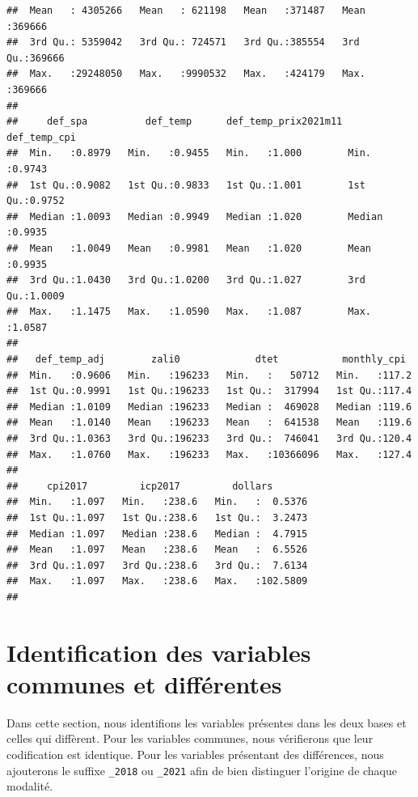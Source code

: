 \documentclass[
]{article}
\begin{document}
\begin{verbatim}
##  Mean   : 4305266   Mean   : 621198   Mean   :371487   Mean   :369666  
##  3rd Qu.: 5359042   3rd Qu.: 724571   3rd Qu.:385554   3rd Qu.:369666  
##  Max.   :29248050   Max.   :9990532   Max.   :424179   Max.   :369666  
##                                                                        
##     def_spa          def_temp      def_temp_prix2021m11  def_temp_cpi   
##  Min.   :0.8979   Min.   :0.9455   Min.   :1.000        Min.   :0.9743  
##  1st Qu.:0.9082   1st Qu.:0.9833   1st Qu.:1.001        1st Qu.:0.9752  
##  Median :1.0093   Median :0.9949   Median :1.020        Median :0.9935  
##  Mean   :1.0049   Mean   :0.9981   Mean   :1.020        Mean   :0.9935  
##  3rd Qu.:1.0430   3rd Qu.:1.0200   3rd Qu.:1.027        3rd Qu.:1.0009  
##  Max.   :1.1475   Max.   :1.0590   Max.   :1.087        Max.   :1.0587  
##                                                                         
##   def_temp_adj        zali0             dtet           monthly_cpi   
##  Min.   :0.9606   Min.   :196233   Min.   :   50712   Min.   :117.2  
##  1st Qu.:0.9991   1st Qu.:196233   1st Qu.:  317994   1st Qu.:117.4  
##  Median :1.0109   Median :196233   Median :  469028   Median :119.6  
##  Mean   :1.0140   Mean   :196233   Mean   :  641538   Mean   :119.6  
##  3rd Qu.:1.0363   3rd Qu.:196233   3rd Qu.:  746041   3rd Qu.:120.4  
##  Max.   :1.0760   Max.   :196233   Max.   :10366096   Max.   :127.4  
##                                                                      
##     cpi2017         icp2017         dollars        
##  Min.   :1.097   Min.   :238.6   Min.   :  0.5376  
##  1st Qu.:1.097   1st Qu.:238.6   1st Qu.:  3.2473  
##  Median :1.097   Median :238.6   Median :  4.7915  
##  Mean   :1.097   Mean   :238.6   Mean   :  6.5526  
##  3rd Qu.:1.097   3rd Qu.:238.6   3rd Qu.:  7.6134  
##  Max.   :1.097   Max.   :238.6   Max.   :102.5809  
## 
\end{verbatim}

\hypertarget{identification-des-variables-communes-et-diffuxe9rentes}{%
\section{Identification des variables communes et
différentes}\label{identification-des-variables-communes-et-diffuxe9rentes}}

Dans cette section, nous identifions les variables présentes dans les
deux bases et celles qui diffèrent. Pour les variables communes, nous
vérifierons que leur codification est identique. Pour les variables
présentant des différences, nous ajouterons le suffixe \texttt{\_2018}
ou \texttt{\_2021} afin de bien distinguer l'origine de chaque modalité.
\end{document}
